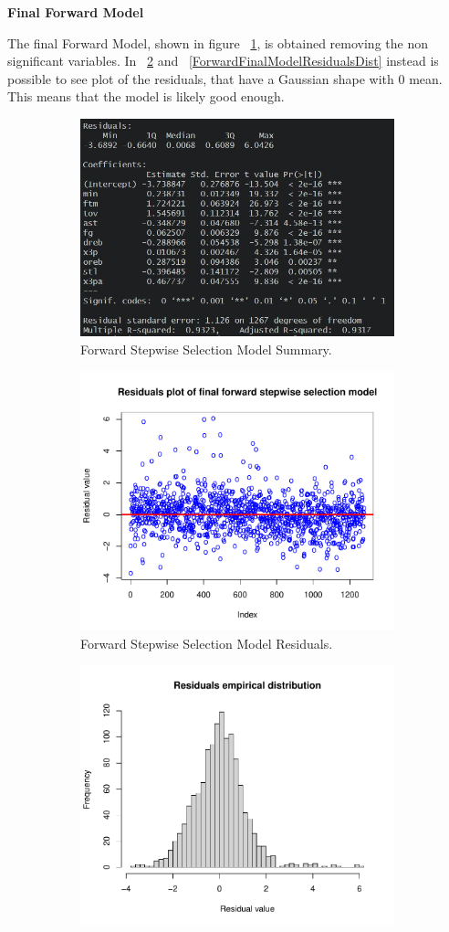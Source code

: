 \vspace{0.2cm}
\textbf{Final Forward Model}

The final Forward Model, shown in figure \Fig~\ref{fig:ForwardFinalModelSummary}, is obtained removing the non significant variables. In \Fig~\ref{fig:ForwardFinalModelResiduals} and \Fig~\ref{ForwardFinalModelResidualsDist} instead is possible to see plot of the residuals, that have a Gaussian shape with 0 mean. This means that the model is likely good enough.

\begin{figure}[h]
	\centering
	\begin{subfigure}{.6\textwidth}
		\centering
		\includegraphics[width=0.6\linewidth]{ImageFiles/Regression/Forward/ForwardFinalModelSummary}
		\caption{Forward Stepwise Selection Model Summary.}
		\label{fig:ForwardFinalModelSummary}
	\end{subfigure}
	\begin{subfigure}{.6\textwidth}
		\centering
		\includegraphics[width=0.6\linewidth]{ImageFiles/Regression/Forward/ForwardFinalModelResiduals}
		\caption{Forward Stepwise Selection Model Residuals.}
		\label{fig:ForwardFinalModelResiduals}
	\end{subfigure}%
	\begin{subfigure}{.6\textwidth}
		\centering
		\includegraphics[width=0.6\linewidth]{ImageFiles/Regression/Forward/ForwardFinalModelResidualsDist}

\end{subfigure}
\end{figure}
